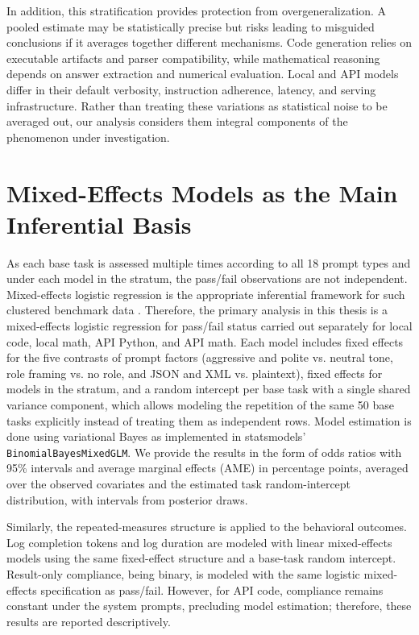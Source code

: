 In addition, this stratification provides protection from overgeneralization. A pooled estimate may be statistically precise but risks leading to misguided conclusions if it averages together different mechanisms. Code generation relies on executable artifacts and parser compatibility, while mathematical reasoning depends on answer extraction and numerical evaluation. Local and API models differ in their default verbosity, instruction adherence, latency, and serving infrastructure. Rather than treating these variations as statistical noise to be averaged out, our analysis considers them integral components of the phenomenon under investigation.

\section{Mixed-Effects Models as the Main Inferential Basis}

As each base task is assessed multiple times according to all 18 prompt types and under each model in the stratum, the pass/fail observations are not independent. Mixed-effects logistic regression is the appropriate inferential framework for such clustered benchmark data \cite{gelman2007data}. Therefore, the primary analysis in this thesis is a mixed-effects logistic regression for pass/fail status carried out separately for local code, local math, API Python, and API math. Each model includes fixed effects for the five contrasts of prompt factors (aggressive and polite vs. neutral tone, role framing vs. no role, and JSON and XML vs. plaintext), fixed effects for models in the stratum, and a random intercept per base task with a single shared variance component, which allows modeling the repetition of the same 50 base tasks explicitly instead of treating them as independent rows. Model estimation is done using variational Bayes as implemented in statsmodels' \texttt{BinomialBayesMixedGLM}. We provide the results in the form of odds ratios with 95\% intervals and average marginal effects (AME) in percentage points, averaged over the observed covariates and the estimated task random-intercept distribution, with intervals from posterior draws.

Similarly, the repeated-measures structure is applied to the behavioral outcomes. Log completion tokens and log duration are modeled with linear mixed-effects models using the same fixed-effect structure and a base-task random intercept. Result-only compliance, being binary, is modeled with the same logistic mixed-effects specification as pass/fail. However, for API code, compliance remains constant under the system prompts, precluding model estimation; therefore, these results are reported descriptively.

